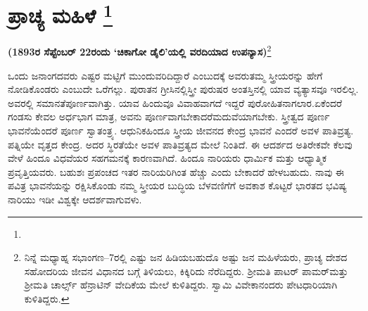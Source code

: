 
\chapter[ಪ್ರಾಚ್ಯ ಮಹಿಳೆ ]{ಪ್ರಾಚ್ಯ ಮಹಿಳೆ \protect\footnote{}}

\vskip 4pt

\centerline{\textbf{(1893ರ ಸೆಪ್ಟೆಂಬರ್​ 22ರಂದು ‘ಚಿಕಾಗೋ ಡೈಲಿ’ಯಲ್ಲಿ ವರದಿಯಾದ ಉಪನ್ಯಾಸ)}\footnote{ ನಿನ್ನೆ ಮಧ್ಯಾಹ್ನ ಸಭಾಂಗಣ–7ರಲ್ಲಿ ಎಷ್ಟು ಜನ ಹಿಡಿಯಬಹುದೊ ಅಷ್ಟು ಜನ ಮಹಿಳೆಯರು, ಪ್ರಾಚ್ಯ ದೇಶದ ಸಹೋದರಿಯ ಜೀವನ ವಿಧಾನದ ಬಗ್ಗೆ ತಿಳಿಯಲು, ಕಿಕ್ಕಿರಿದು ನೆರೆದಿದ್ದರು. ಶ‍್ರೀಮತಿ ಪಾಟರ್​ ಪಾಮರ್​ ಮತ್ತು ಶ‍್ರೀಮತಿ ಚಾರ್ಲ್ಸ್​ ಹೆನ್ರಾಟಿನ್​ ವೇದಿಕೆಯ ಮೇಲೆ ಕುಳಿತಿದ್ದರು. ಸ್ವಾಮಿ ವಿವೇಕಾನಂದರು ಪೇಟಧಾರಿಯಾಗಿ ಕುಳಿತಿದ್ದರು.}}

\vskip 4pt

ಒಂದು ಜನಾಂಗದವರು ಎಷ್ಟರ ಮಟ್ಟಿಗೆ ಮುಂದುವರಿದಿದ್ದಾರೆ ಎಂಬುದಕ್ಕೆ ಅವರು\break ತಮ್ಮ ಸ್ತ್ರೀಯರನ್ನು ಹೇಗೆ ನೋಡಿಕೊಂಡರು ಎಂಬುದೇ ಒರೆಗಲ್ಲು. ಪುರಾತನ ಗ್ರೀಸಿನಲ್ಲಿ\break ಸ್ತ್ರೀ ಪುರುಷರ ಅಂತಸ್ತಿನಲ್ಲಿ ಯಾವ ವ್ಯತ್ಯಾಸವೂ ಇರಲಿಲ್ಲ. ಅವರಲ್ಲಿ ಸಮಾನತೆ\break ಪೂರ್ಣವಾಗಿತ್ತು. ಯಾವ ಹಿಂದುವೂ ವಿವಾಹವಾಗದೆ ಇದ್ದರೆ ಪುರೋಹಿತನಾಗಲಾರ.\break ಏಕೆಂದರೆ ಗಂಡಸು ಕೇವಲ ಅರ್ಧಭಾಗ ಮಾತ್ರ, ಅವನು ಪೂರ್ಣವಾಗಬೇಕಾದರೆ\break ಮದುವೆಯಾಗಬೇಕು. ಸ್ತ್ರೀತ್ವದ ಪೂರ್ಣ ಭಾವನೆಯೆಂದರೆ ಪೂರ್ಣ ಸ್ವಾತಂತ್ರ್ಯ. ಆಧುನಿಕ\break ಹಿಂದೂ ಸ್ತ್ರೀಯ ಜೀವನದ ಕೇಂದ್ರ ಭಾವನೆ ಎಂದರೆ ಅವಳ ಪಾತಿವ್ರತ್ಯ. ಪತ್ನಿಯೇ ವೃತ್ತದ ಕೇಂದ್ರ. ಅದರ ಸ್ಥಿರತೆಯೇ ಅವಳ ಪಾತಿವ್ರತ್ಯದ ಮೇಲೆ ನಿಂತಿದೆ. ಈ ಆದರ್ಶದ ಅತಿರೇಕವೇ ಕೆಲವು ವೇಳೆ ಹಿಂದೂ ವಿಧವೆಯರ ಸಹಗಮನಕ್ಕೆ ಕಾರಣವಾಗಿದೆ. ಹಿಂದೂ ನಾರಿಯರು ಧಾರ್ಮಿಕ ಮತ್ತು ಆಧ್ಯಾತ್ಮಿಕ ಪ್ರವೃತ್ತಿಯವರು. ಬಹುಶಃ ಪ್ರಪಂಚದ ಇತರ ನಾರಿಯರಿಗಿಂತ ಹೆಚ್ಚು ಎಂದು ಬೇಕಾದರೆ ಹೇಳಬಹುದು. ನಾವು ಈ ಪವಿತ್ರ ಭಾವನೆಯನ್ನು ರಕ್ಷಿಸಿಕೊಂಡು ನಮ್ಮ ಸ್ತ್ರೀಯರ ಬುದ್ಧಿಯ ಬೆಳವಣಿಗೆಗೆ ಅವಕಾಶ ಕೊಟ್ಟರೆ ಭಾರತದ ಭವಿಷ್ಯ ನಾರಿಯು ಇಡೀ ವಿಶ್ವಕ್ಕೇ ಆದರ್ಶವಾಗುವಳು.

\vskip 6pt

